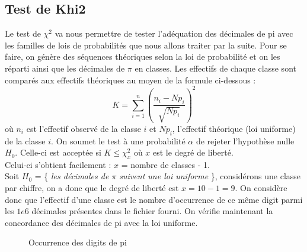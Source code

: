 \documentclass[10pt,a4paper]{article}
\begin{document}
\subsection{Test de Khi2}
Le test de $\chi^2$ va nous permettre de tester l'adéquation des décimales de pi avec les familles de lois de probabilités que nous allons traiter par la suite. Pour se faire, on génère des séquences théoriques selon la loi de probabilité et on les réparti ainsi que les décimales de $\pi$ en classes. Les effectifs de chaque classe sont comparés aux effectifs théoriques au moyen de la formule ci-dessous :
\[ K = \displaystyle\sum_{i=1}^n (\frac{n_i-Np_i}{\sqrt{Np_i}})^2\]
où $n_i$ est l'effectif observé de la classe $i$ et $Np_i$, l'effectif théorique (loi uniforme) de la classe $i$. On soumet le test à une probabilité $\alpha$ de rejeter l'hypothèse nulle $H_0$. Celle-ci est acceptée si $K \leq \chi_x^2$ où $x$ est le degré de liberté. \\Celui-ci s'obtient facilement : $x$ = nombre de classes - 1. \\

Soit $H_0$ = \{\textit{ les décimales de $\pi$ suivent une loi uniforme }\}, considérons une classe par chiffre, on a donc que le degré de liberté est $x = 10 - 1 = 9 $. On considère donc que l'effectif d'une classe est le nombre d'occurrence de ce même digit parmi les $1e6$ décimales présentes dans le fichier fourni. On vérifie maintenant la concordance des décimales de pi avec la loi uniforme.
\begin{figure}[h!]
\caption{Occurrence des digits de pi}
\label{khi2histo}
\end{figure}
\end{document}
